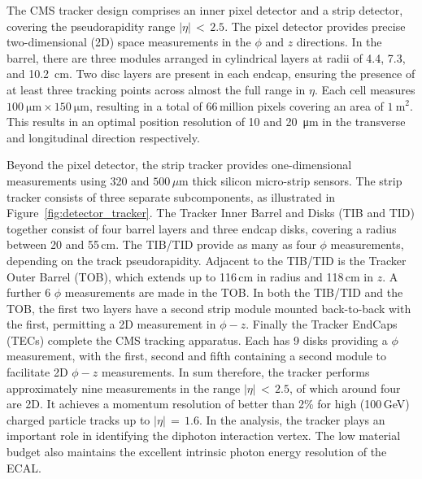 The CMS tracker design comprises an inner pixel detector and a strip detector, covering the pseudorapidity range $|\eta|\,<\,2.5$.
The pixel detector provides precise two-dimensional (2D) space measurements in the $\phi$ and $z$ directions.
In the barrel, there are three modules arranged in cylindrical layers at radii of 4.4, 7.3, and \SI{10.2}{cm}. 
Two disc layers are present in each endcap, ensuring the presence of at least three tracking points across almost the full range in $\eta$.
Each cell measures $\SI{100}{\micro\metre}\times\SI{150}{\micro\metre}$, resulting in a total of 66\,million pixels covering an area of $\SI{1}{\metre^2}$.
This results in an optimal position resolution of 10 and \SI{20}{\micro\metre} in the transverse and longitudinal direction respectively.

Beyond the pixel detector, the strip tracker provides one-dimensional measurements using 320 and $500\,\mu\textrm{m}$ thick silicon micro-strip sensors.
The strip tracker consists of three separate subcomponents, as illustrated in Figure~\ref{fig:detector_tracker}.
The Tracker Inner Barrel and Disks (TIB and TID) together consist of four barrel layers and three endcap disks, covering a radius between 20 and 55\,cm. %
The TIB/TID provide as many as four $\phi$ measurements, depending on the track pseudorapidity.
Adjacent to the TIB/TID is the Tracker Outer Barrel (TOB), which extends up to 116\,cm in radius and 118\,cm in $z$.
A further 6 $\phi$ measurements are made in the TOB.
In both the TIB/TID and the TOB, the first two layers have a second strip module mounted back-to-back with the first, permitting a 2D measurement in $\phi-z$.
Finally the Tracker EndCaps (TECs) complete the CMS tracking apparatus.
Each has 9 disks providing a $\phi$ measurement, with the first, second and fifth containing a second module to facilitate 2D $\phi-z$ measurements.
In sum therefore, the tracker performs approximately nine measurements in the range $|\eta|\,<\,2.5$, of which around four are 2D.
It achieves a momentum resolution of better than 2\% for high \pt (100\,GeV) charged particle tracks up to $|\eta|\,=\,1.6$. %
In the \Hgg analysis, the tracker plays an important role in identifying the diphoton interaction vertex. %
The low material budget also maintains the excellent intrinsic photon energy resolution of the ECAL.

